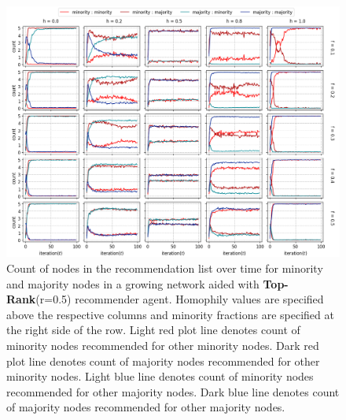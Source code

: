 \begin{appendices}

\begin{figure}[h!]
	\centering
	\includegraphics[width=1.0\textwidth]{images/count_top05.png}
	\caption{Count of nodes in the recommendation list over time for minority and majority nodes in a growing network aided with \textbf{Top-Rank}(r=0.5) recommender agent. Homophily values are specified above the respective columns and minority fractions are specified at the right side of the row. Light red plot line denotes count of minority nodes recommended for other minority nodes. Dark red plot line denotes count of majority nodes recommended for other minority nodes. Light blue line denotes count of minority nodes recommended for other majority nodes. Dark blue line denotes count of majority nodes recommended for other majority nodes.}
	\label{count_top05}
\end{figure}


\end{appendices}
